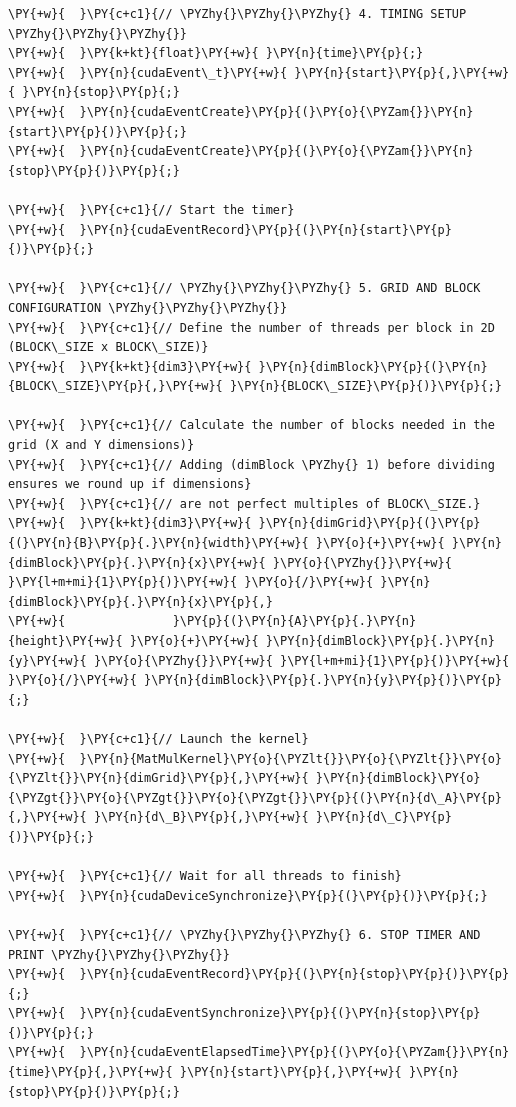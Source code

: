 \begin{Verbatim}[label=\makebox{\url{https://github.com/lucabaldini/cmepda/tree/master/slides/latex/snippets/MatrixMultiplication_global.cu}},commandchars=\\\{\}]
\PY{+w}{  }\PY{c+c1}{// \PYZhy{}\PYZhy{}\PYZhy{} 4. TIMING SETUP \PYZhy{}\PYZhy{}\PYZhy{}}
\PY{+w}{  }\PY{k+kt}{float}\PY{+w}{ }\PY{n}{time}\PY{p}{;}
\PY{+w}{  }\PY{n}{cudaEvent\_t}\PY{+w}{ }\PY{n}{start}\PY{p}{,}\PY{+w}{ }\PY{n}{stop}\PY{p}{;}
\PY{+w}{  }\PY{n}{cudaEventCreate}\PY{p}{(}\PY{o}{\PYZam{}}\PY{n}{start}\PY{p}{)}\PY{p}{;}
\PY{+w}{  }\PY{n}{cudaEventCreate}\PY{p}{(}\PY{o}{\PYZam{}}\PY{n}{stop}\PY{p}{)}\PY{p}{;}

\PY{+w}{  }\PY{c+c1}{// Start the timer}
\PY{+w}{  }\PY{n}{cudaEventRecord}\PY{p}{(}\PY{n}{start}\PY{p}{)}\PY{p}{;}

\PY{+w}{  }\PY{c+c1}{// \PYZhy{}\PYZhy{}\PYZhy{} 5. GRID AND BLOCK CONFIGURATION \PYZhy{}\PYZhy{}\PYZhy{}}
\PY{+w}{  }\PY{c+c1}{// Define the number of threads per block in 2D (BLOCK\_SIZE x BLOCK\_SIZE)}
\PY{+w}{  }\PY{k+kt}{dim3}\PY{+w}{ }\PY{n}{dimBlock}\PY{p}{(}\PY{n}{BLOCK\_SIZE}\PY{p}{,}\PY{+w}{ }\PY{n}{BLOCK\_SIZE}\PY{p}{)}\PY{p}{;}

\PY{+w}{  }\PY{c+c1}{// Calculate the number of blocks needed in the grid (X and Y dimensions)}
\PY{+w}{  }\PY{c+c1}{// Adding (dimBlock \PYZhy{} 1) before dividing ensures we round up if dimensions}
\PY{+w}{  }\PY{c+c1}{// are not perfect multiples of BLOCK\_SIZE.}
\PY{+w}{  }\PY{k+kt}{dim3}\PY{+w}{ }\PY{n}{dimGrid}\PY{p}{(}\PY{p}{(}\PY{n}{B}\PY{p}{.}\PY{n}{width}\PY{+w}{ }\PY{o}{+}\PY{+w}{ }\PY{n}{dimBlock}\PY{p}{.}\PY{n}{x}\PY{+w}{ }\PY{o}{\PYZhy{}}\PY{+w}{ }\PY{l+m+mi}{1}\PY{p}{)}\PY{+w}{ }\PY{o}{/}\PY{+w}{ }\PY{n}{dimBlock}\PY{p}{.}\PY{n}{x}\PY{p}{,}
\PY{+w}{               }\PY{p}{(}\PY{n}{A}\PY{p}{.}\PY{n}{height}\PY{+w}{ }\PY{o}{+}\PY{+w}{ }\PY{n}{dimBlock}\PY{p}{.}\PY{n}{y}\PY{+w}{ }\PY{o}{\PYZhy{}}\PY{+w}{ }\PY{l+m+mi}{1}\PY{p}{)}\PY{+w}{ }\PY{o}{/}\PY{+w}{ }\PY{n}{dimBlock}\PY{p}{.}\PY{n}{y}\PY{p}{)}\PY{p}{;}

\PY{+w}{  }\PY{c+c1}{// Launch the kernel}
\PY{+w}{  }\PY{n}{MatMulKernel}\PY{o}{\PYZlt{}}\PY{o}{\PYZlt{}}\PY{o}{\PYZlt{}}\PY{n}{dimGrid}\PY{p}{,}\PY{+w}{ }\PY{n}{dimBlock}\PY{o}{\PYZgt{}}\PY{o}{\PYZgt{}}\PY{o}{\PYZgt{}}\PY{p}{(}\PY{n}{d\_A}\PY{p}{,}\PY{+w}{ }\PY{n}{d\_B}\PY{p}{,}\PY{+w}{ }\PY{n}{d\_C}\PY{p}{)}\PY{p}{;}

\PY{+w}{  }\PY{c+c1}{// Wait for all threads to finish}
\PY{+w}{  }\PY{n}{cudaDeviceSynchronize}\PY{p}{(}\PY{p}{)}\PY{p}{;}

\PY{+w}{  }\PY{c+c1}{// \PYZhy{}\PYZhy{}\PYZhy{} 6. STOP TIMER AND PRINT \PYZhy{}\PYZhy{}\PYZhy{}}
\PY{+w}{  }\PY{n}{cudaEventRecord}\PY{p}{(}\PY{n}{stop}\PY{p}{)}\PY{p}{;}
\PY{+w}{  }\PY{n}{cudaEventSynchronize}\PY{p}{(}\PY{n}{stop}\PY{p}{)}\PY{p}{;}
\PY{+w}{  }\PY{n}{cudaEventElapsedTime}\PY{p}{(}\PY{o}{\PYZam{}}\PY{n}{time}\PY{p}{,}\PY{+w}{ }\PY{n}{start}\PY{p}{,}\PY{+w}{ }\PY{n}{stop}\PY{p}{)}\PY{p}{;}


\end{Verbatim}
